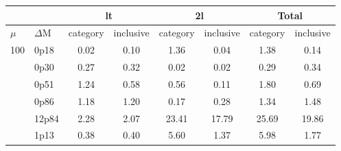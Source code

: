 \documentclass[12pt,A4paper]{article}
\begin{document}
\begin{table}[]
\begin{tabular}{llllllll}
\cline{3-8}
                                             & \multicolumn{1}{l|}{}       & \multicolumn{2}{c|}{lt}                                        & \multicolumn{2}{c|}{2l}                                        & \multicolumn{2}{c|}{Total}                                     \\ \hline 
\multicolumn{1}{|l|}{$\mu$}                    & \multicolumn{1}{l|}{$\Delta\mathrm{M}$}     & \multicolumn{1}{l|}{category} & \multicolumn{1}{l|}{inclusive} & \multicolumn{1}{l|}{category} & \multicolumn{1}{l|}{inclusive} & \multicolumn{1}{l|}{category} & \multicolumn{1}{l|}{inclusive} \\ \hline

\multicolumn{1}{|l|}{\multirow{13}{*}{100}} & \multicolumn{1}{l|}{0p18} & \multicolumn{1}{c|}{0.02}        & \multicolumn{1}{c|}{0.10}         & \multicolumn{1}{c|}{1.36}        & \multicolumn{1}{c|}{0.04}         & \multicolumn{1}{c|}{1.38}        & \multicolumn{1}{c|}{0.14}         \\ \cline{2-8} 
\multicolumn{1}{|l|}{} & \multicolumn{1}{l|}{0p30} & \multicolumn{1}{c|}{0.27}        & \multicolumn{1}{c|}{0.32}         & \multicolumn{1}{c|}{0.02}        & \multicolumn{1}{c|}{0.02}         & \multicolumn{1}{c|}{0.29}        & \multicolumn{1}{c|}{0.34}         \\ \cline{2-8}
\multicolumn{1}{|l|}{} & \multicolumn{1}{l|}{0p51} & \multicolumn{1}{c|}{1.24}        & \multicolumn{1}{c|}{0.58}         & \multicolumn{1}{c|}{0.56}        & \multicolumn{1}{c|}{0.11}         & \multicolumn{1}{c|}{1.80}        & \multicolumn{1}{c|}{0.69}         \\ \cline{2-8}
\multicolumn{1}{|l|}{} & \multicolumn{1}{l|}{0p86} & \multicolumn{1}{c|}{1.18}        & \multicolumn{1}{c|}{1.20}         & \multicolumn{1}{c|}{0.17}        & \multicolumn{1}{c|}{0.28}         & \multicolumn{1}{c|}{1.34}        & \multicolumn{1}{c|}{1.48}         \\ \cline{2-8}
\multicolumn{1}{|l|}{} & \multicolumn{1}{l|}{12p84} & \multicolumn{1}{c|}{2.28}        & \multicolumn{1}{c|}{2.07}         & \multicolumn{1}{c|}{23.41}        & \multicolumn{1}{c|}{17.79}         & \multicolumn{1}{c|}{25.69}        & \multicolumn{1}{c|}{19.86}         \\ \cline{2-8}
\multicolumn{1}{|l|}{} & \multicolumn{1}{l|}{1p13} & \multicolumn{1}{c|}{0.38}        & \multicolumn{1}{c|}{0.40}         & \multicolumn{1}{c|}{5.60}        & \multicolumn{1}{c|}{1.37}         & \multicolumn{1}{c|}{5.98}        & \multicolumn{1}{c|}{1.77}         \\ \cline{2-8}

\end{tabular}
\end{table}
\end{document}
